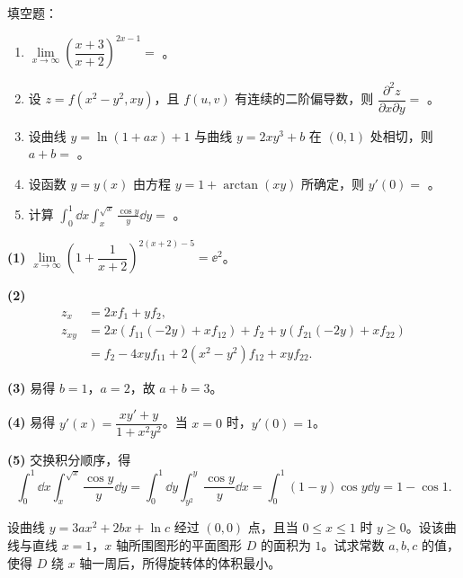 
填空题：
\begin{enumerate}[label=(\arabic*)]
  \item $\lim\limits_{x\to\infty}\left(\dfrac{x+3}{x+2}\right)^{2x-1}=$ \underline{\hspace{6em}}。
  \item 设 $z=f(x^2-y^2,xy)$，且 $f(u,v)$ 有连续的二阶偏导数，则 $\dfrac{\partial^2 z}{\partial x\partial y}=$ \underline{\hspace{6em}}。
  \item 设曲线 $y=\ln(1+ax)+1$ 与曲线 $y=2xy^3+b$ 在 $(0,1)$ 处相切，则 $a+b=$ \underline{\hspace{6em}}。
  \item 设函数 $y=y(x)$ 由方程 $y=1+\arctan(xy)$ 所确定，则 $y'(0)=$ \underline{\hspace{6em}}。
  \item 计算 $\displaystyle\int_0^1 \dd x\int_x^{\sqrt{x}}\frac{\cos y}{y}\dd y=$ \underline{\hspace{6em}}。
\end{enumerate}
\begin{solution}
\textbf{(1)} $\lim\limits_{x\to\infty}\left(1+\dfrac{1}{x+2}\right)^{2(x+2)-5}=\ee^2$。

\textbf{(2)}
\begin{align*}
z_x &= 2x f_1 + y f_2,\\
z_{xy} &= 2x\left(f_{11}(-2y) + x f_{12}\right) + f_2 + y\left(f_{21}(-2y) + x f_{22}\right)\\
&= f_2 - 4xy f_{11} + 2(x^2 - y^2) f_{12} + xy f_{22}.
\end{align*}

\textbf{(3)} 易得 $b=1$，$a=2$，故 $a+b=3$。

\textbf{(4)} 易得 $y'(x)=\dfrac{xy'+y}{1+x^2y^2}$。当 $x=0$ 时，$y'(0)=1$。

\textbf{(5)} 交换积分顺序，得
\[ \int_0^1 \dd x\int_x^{\sqrt{x}}\frac{\cos y}{y}\dd y=\int_0^1 \dd y\int_{y^2}^{y}\frac{\cos y}{y}\dd x=\int_0^1(1-y)\cos y\dd y=1-\cos 1. \]
\end{solution}

设曲线 $y=3ax^2+2bx+\ln c$ 经过 $(0,0)$ 点，且当 $0\le x\le 1$ 时 $y\ge 0$。设该曲线与直线 $x=1$，$x$ 轴所围图形的平面图形 $D$ 的面积为 $1$。试求常数 $a,b,c$ 的值，使得 $D$ 绕 $x$ 轴一周后，所得旋转体的体积最小。

